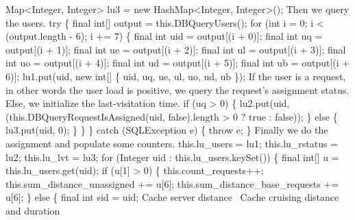   Map<Integer, Integer>             lu3 = new HashMap<Integer, Integer>();
\nwendcode{}\nwdocspar
{\small Then we query the users.}
\nwenddocs{}\plusendmoddef
  try \{
    final int[] output = this.DBQueryUsers();
    for (int i = 0; i < (output.length - 6); i += 7) \{
      final int uid = output[(i + 0)];
      final int  uq = output[(i + 1)];
      final int  ue = output[(i + 2)];
      final int  ul = output[(i + 3)];
      final int  uo = output[(i + 4)];
      final int  ud = output[(i + 5)];
      final int  ub = output[(i + 6)];
      lu1.put(uid, new int[] \{ uid, uq, ue, ul, uo, ud, ub \});
\nwendcode{}\nwdocspar
{\small If the user is a request, in other words the user load is positive,
we query the request's assignment status. Else, we initialize the last-visitation time.}
\nwenddocs{}\plusendmoddef
      if (uq > 0) \{
        lu2.put(uid, (this.DBQueryRequestIsAssigned(uid, false).length > 0 ? true : false));
      \} else \{
        lu3.put(uid, 0);
      \}
    \}
  \} catch (SQLException e) \{
    throw e;
  \}
\nwendcode{}\nwdocspar
{\small Finally we do the assignment and populate some counters.}
\nwenddocs{}\plusendmoddef
  this.lu_users   = lu1;
  this.lu_rstatus = lu2;
  this.lu_lvt     = lu3;
  for (Integer uid : this.lu_users.keySet()) \{
    final int[] u = this.lu_users.get(uid);
    if (u[1] > 0) \{
      this.count_requests++;
      this.sum_distance_unassigned += u[6];
      this.sum_distance_base_requests += u[6];
    \} else \{
      final int sid = uid;
      \LA{}Cache server distance~{\nwtagstyle{}}\RA{}
      \LA{}Cache cruising distance and duration~{\nwtagstyle{}}\RA{}
